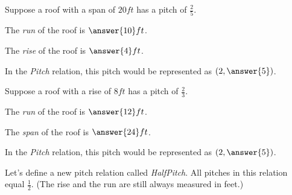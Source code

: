 \documentclass{ximera}
\begin{document}
\begin{question}

Suppose a roof with a span of $20 ft$ has a pitch of $\frac{2}{5}$.  

The \textit{run} of the roof is $\answer{10} ft$.

The \textit{rise} of the roof is $\answer{4} ft$.

In the \textit{Pitch} relation, this pitch would be represented as $\left( 2, \answer{5} \right)$.

\end{question}











\begin{question}

Suppose a roof with a rise of $8 ft$ has a pitch of $\frac{2}{3}$.  

The \textit{run} of the roof is $\answer{12} ft$.

The \textit{span} of the roof is $\answer{24} ft$.

In the \textit{Pitch} relation, this pitch would be represented as $\left( 2, \answer{5} \right)$.

\end{question}







Let's define a new pitch relation called \textit{HalfPitch}.  All pitches in this relation equal $\frac{1}{2}$.  (The rise and the run are still always measured in feet.)
\end{document}

